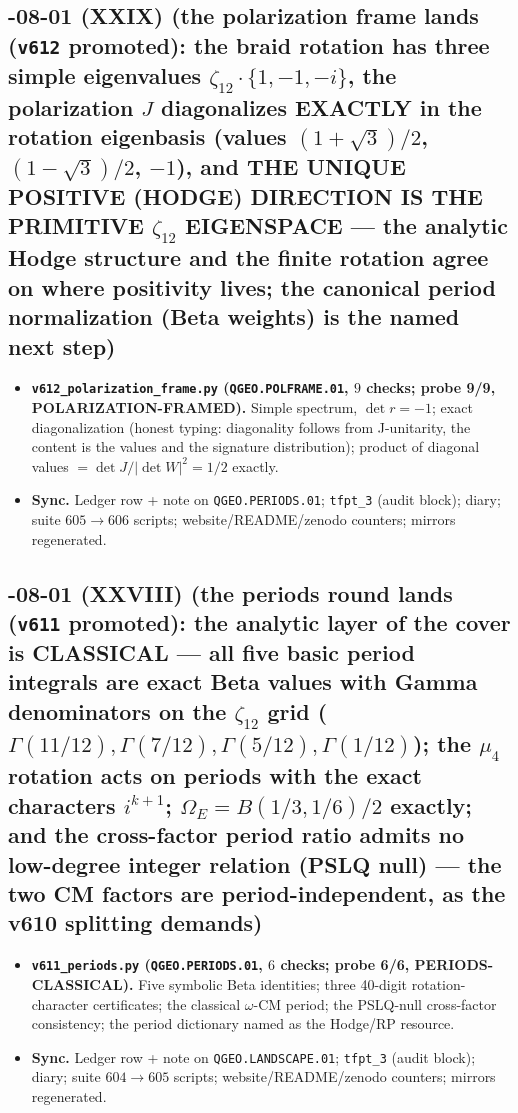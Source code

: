 \documentclass[11pt]{article}
\begin{document}
\subsection*{-08-01 (XXIX) (the polarization frame lands (\texttt{v612} promoted): the braid rotation has three simple eigenvalues $\zeta_{12}\cdot\{1,-1,-i\}$, the polarization $J$ diagonalizes EXACTLY in the rotation eigenbasis (values $(1+\sqrt3)/2$, $(1-\sqrt3)/2$, $-1$), and THE UNIQUE POSITIVE (HODGE) DIRECTION IS THE PRIMITIVE $\zeta_{12}$ EIGENSPACE --- the analytic Hodge structure and the finite rotation agree on where positivity lives; the canonical period normalization (Beta weights) is the named next step)}
\begin{itemize}[leftmargin=1.5em]
\item \textbf{\texttt{v612\_polarization\_frame.py} (\texttt{QGEO.POLFRAME.01}, $9$ checks;
probe 9/9, POLARIZATION-FRAMED).} Simple spectrum, $\det r=-1$; exact diagonalization
(honest typing: diagonality follows from J-unitarity, the content is the values and the
signature distribution); product of diagonal values $=\det J/|\det W|^2=1/2$ exactly.
\item \textbf{Sync.} Ledger row + note on \texttt{QGEO.PERIODS.01}; \texttt{tfpt\_3} (audit
block); diary; suite $605\to606$ scripts; website/README/zenodo counters; mirrors
regenerated.
\end{itemize}

\subsection*{-08-01 (XXVIII) (the periods round lands (\texttt{v611} promoted): the analytic layer of the cover is CLASSICAL --- all five basic period integrals are exact Beta values with Gamma denominators on the $\zeta_{12}$ grid ($\Gamma(11/12),\Gamma(7/12),\Gamma(5/12),\Gamma(1/12)$); the $\mu_4$ rotation acts on periods with the exact characters $i^{k+1}$; $\Omega_E=B(1/3,1/6)/2$ exactly; and the cross-factor period ratio admits no low-degree integer relation (PSLQ null) --- the two CM factors are period-independent, as the v610 splitting demands)}
\begin{itemize}[leftmargin=1.5em]
\item \textbf{\texttt{v611\_periods.py} (\texttt{QGEO.PERIODS.01}, $6$ checks; probe 6/6,
PERIODS-CLASSICAL).} Five symbolic Beta identities; three 40-digit rotation-character
certificates; the classical $\omega$-CM period; the PSLQ-null cross-factor consistency;
the period dictionary named as the Hodge/RP resource.
\item \textbf{Sync.} Ledger row + note on \texttt{QGEO.LANDSCAPE.01}; \texttt{tfpt\_3}
(audit block); diary; suite $604\to605$ scripts; website/README/zenodo counters; mirrors
regenerated.
\end{itemize}
\end{document}

